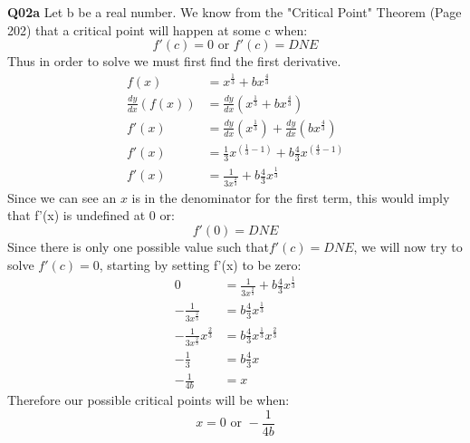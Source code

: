 \documentclass[11pt]{article}
\begin{document}
\parindent=0pt

\textbf{Q02a} Let b be a real number. We know from the "Critical Point" Theorem (Page 202) that a critical point will happen at some c when:
\[ f'(c) = 0 \text{ or } f'(c) = DNE \]
Thus in order to solve we must first find the first derivative.
\begin{align*}
f(x) & = x^{\frac{1}{3}} + bx^{\frac{4}{3}}\\
\frac{dy}{dx}(f(x)) & = \frac{dy}{dx}(x^{\frac{1}{3}} + bx^{\frac{4}{3}})\\
f'(x) & = \frac{dy}{dx}(x^{\frac{1}{3}}) + \frac{dy}{dx}(bx^{\frac{4}{3}})\\
f'(x) & = \frac{1}{3}x^{(\frac{1}{3}-1)} + b\frac{4}{3}x^{(\frac{4}{3} -1)}\\
f'(x) & = \frac{1}{3x^{\frac{2}{3}}} + b\frac{4}{3}x^{\frac{1}{3}}
\end{align*}
Since we can see an $x$ is in the denominator for the first term, this would imply that f'(x) is undefined at 0 or:
\[ f'(0) = DNE \]
Since there is only one possible value such that$ f'(c) = DNE$, we will now try to solve $f'(c) = 0$, starting by setting f'(x) to be zero:
\begin{align*}
0 & = \frac{1}{3x^{\frac{2}{3}}} + b\frac{4}{3}x^{\frac{1}{3}} \\
 -\frac{1}{3x^{\frac{2}{3}}} & = b\frac{4}{3}x^{\frac{1}{3}} \\
 -\frac{1}{3x^{\frac{2}{3}}}x^{\frac{2}{3}} & = b\frac{4}{3}x^{\frac{1}{3}}x^{\frac{2}{3}} \\
 -\frac{1}{3} & = b\frac{4}{3}x \\
 -\frac{1}{4b} & = x
\end{align*}
Therefore our possible critical points will be when:
\[ x = 0 \text{ or }  -\frac{1}{4b} \] \\\\\\\\\\\\\\
\end{document}
